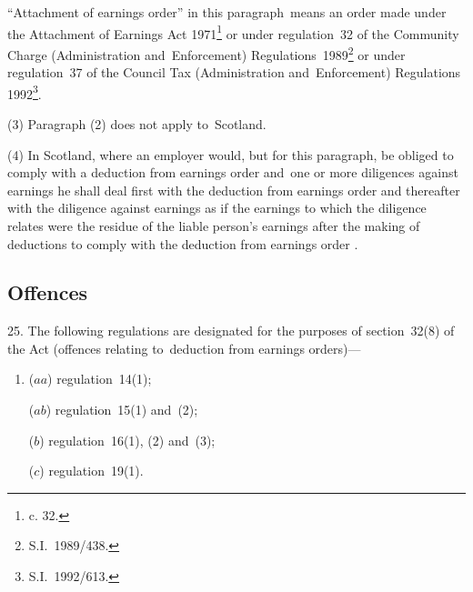 \documentclass[12pt,a4paper]{article}
\begin{document}
“Attachment of earnings order” in this paragraph~means an order made under the Attachment of Earnings Act 1971\footnote{ c. 32.} or under regulation~32 of the Community Charge (Administration and~Enforcement) Regulations~1989\footnote{\frenchspacing S.I.~1989/438.}
or under regulation~37 of the Council Tax (Administration and~Enforcement) Regulations 1992\footnote{\frenchspacing  S.I.~1992/613.}. %

(3) Paragraph (2) does not apply to~Scotland.

(4) In Scotland, where an employer would, but for this paragraph, be obliged to comply with 
a deduction from earnings order  %
and~one or more diligences against earnings he shall deal first with the deduction from earnings order
and thereafter with the diligence against earnings as if the earnings to which the diligence relates were the residue of the liable person’s earnings after the making of deductions to comply with the deduction from earnings order%
.


\subsection[25. Offences]{Offences}

25.  The following regulations are designated for the purposes of section~32(8) of the Act (offences relating to~deduction from earnings orders)—
\begin{enumerate}\item[]
($aa$) regulation~14(1);

($ab$)  %
regulation~15(1) and~(2);

($b$) regulation~16(1), (2) and~(3);

($c$) regulation~19(1).
\end{enumerate}
\end{document}
